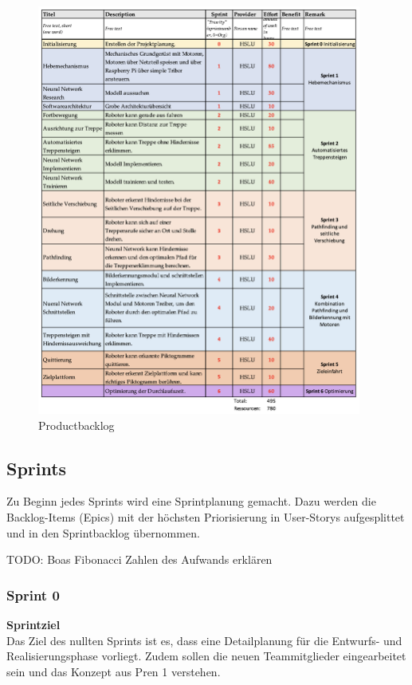 \begin{figure}[H]
  \includegraphics[width=0.95\textwidth]{img/projektmanagement/ProductBacklog PREN2.png}
  \centering
  \caption{Productbacklog}
  \label{fig:productbacklog}
\end{figure}


\subsection{Sprints}
Zu Beginn jedes Sprints wird eine Sprintplanung gemacht. Dazu werden die Backlog-Items (Epics) mit der höchsten Priorisierung in User-Storys aufgesplittet und in den Sprintbacklog übernommen. 

TODO: Boas Fibonacci Zahlen des Aufwands erklären

\subsubsection{Sprint 0}
\textbf{Sprintziel}\\
Das Ziel des nullten Sprints ist es, dass eine Detailplanung für die Entwurfs- und Realisierungsphase vorliegt. Zudem sollen die neuen Teammitglieder eingearbeitet sein und das Konzept aus Pren 1 verstehen. 

